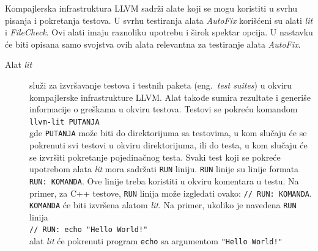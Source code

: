 \documentclass[12pt,oneside]{memoir}
\begin{document}
Kompajlerska infrastruktura LLVM sadr\v{z}i alate koji se mogu koristiti u svrhu pisanja i pokretanja testova. U svrhu testiranja alata \textit{AutoFix}
kori\v{s}\'{c}eni su alati \textit{lit} i \textit{FileCheck}. Ovi alati imaju raznoliku upotrebu i \v{s}irok spektar opcija. U nastavku \'{c}e biti opisana samo svojstva ovih alata relevantna za testiranje alata \textit{AutoFix}. \par
\begin{description}
\item[Alat \textit{lit}] slu\v{z}i za izvr\v{s}avanje testova i testnih paketa (eng.~\textit{test suites}) u okviru kompajlerske infrastrukture LLVM. Alat takođe sumira rezultate i generi\v{s}e informacije o gre\v{s}kama u okviru testova.
Testovi se pokre\'{c}u komandom \\
\texttt{llvm-lit PUTANJA}
\\
gde \texttt{PUTANJA} mo\v{z}e biti do direktorijuma sa testovima, u kom slu\v{c}aju \'{c}e se pokrenuti svi testovi u okviru direktorijuma, ili do testa, u kom slu\v{c}aju \'{c}e se izvr\v{s}iti pokretanje pojedina\v{c}nog testa.
Svaki test koji se pokre\'{c}e upotrebom alata \textit{lit} mora sadr\v{z}ati \texttt{RUN} liniju. \texttt{RUN} linije su linije formata \texttt{RUN: KOMANDA}. Ove linije treba koristiti u okviru komentara u testu. Na primer, za C++ testove, \texttt{RUN} linija mo\v{z}e izgledati ovako: \texttt{// RUN: KOMANDA}. \\ \texttt{KOMANDA} \'{c}e biti izvr\v{s}ena alatom \textit{lit}. Na primer, ukoliko je navedena \texttt{RUN} linija \\
\texttt{// RUN: echo "Hello World!"} \\
alat \textit{lit} \'{c}e pokrenuti program \texttt{echo} sa argumentom \texttt{"Hello World!"}


\end{description}
\end{document}
